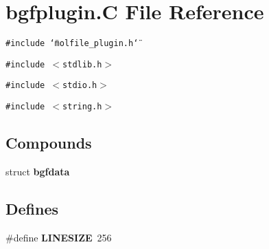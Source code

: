 \section{bgfplugin.C File Reference}
\label{bgfplugin_8C}
{\tt \#include \char`\"{}molfile\_\-plugin.h\char`\"{}}\par
{\tt \#include $<$stdlib.h$>$}\par
{\tt \#include $<$stdio.h$>$}\par
{\tt \#include $<$string.h$>$}\par
\subsection*{Compounds}
\begin{CompactItemize}
\item 
struct {\bf bgfdata}
\end{CompactItemize}
\subsection*{Defines}
\begin{CompactItemize}
\item 
\#define {\bf LINESIZE}\ 256
\end{CompactItemize}
